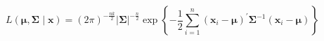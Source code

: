 \begin{equation}
    L
    \left(
    \boldsymbol{\mu},
    \boldsymbol{\Sigma}
    \mid
    \mathbf{x}
    \right)
    =
    \left(
    2
    \pi
    \right)^{-\frac{nk}{2}}
    \left|
    \boldsymbol{\Sigma}
    \right|^{-\frac{n}{2}}
    \exp
    \left\{
    -
    \frac{1}{2}
    \sum_{i = 1}^{n}
    \left(
      \mathbf{x}_{i}
      -
      \boldsymbol{\mu}
    \right)^{\prime}
    \boldsymbol{\Sigma}^{-1}
    \left(
      \mathbf{x}_{i}
      -
      \boldsymbol{\mu}
    \right)
    \right\}
    \label{eq:multiNorm-mvn-likelihood}
\end{equation}

